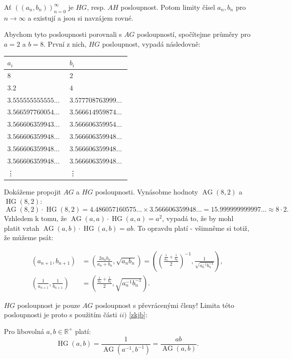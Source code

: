 \documentclass[12pt]{report}
\DeclareMathOperator{\AG}{AG}
\DeclareMathOperator{\HG}{HG}
\begin{document}
\begin{veta}
Ať $((a_n,b_n))_{n=0}^{\infty}$ je $HG$, resp. $AH$ posloupnost. Potom limity čísel $a_n,b_n$ pro $n \rightarrow \infty$ a existují a jsou si navzájem rovné.
\end{veta}

 Abychom tyto posloupnosti porovnali s $AG$ posloupností, spočítejme průměry pro $a=2$ a $b=8$. První z nich, $HG$ posloupnost, vypadá následovně:
\begin{longtable}[H]{>{\raggedright\arraybackslash}p{0.3\linewidth}p{0.202\linewidth}}
\toprule
$a_i$ & $b_i$\\
\midrule
$8$ & \noindent $2$\\
$3.2$ & \noindent $4$\\
$3.555555555555\dots$ & $3.577708763999\dots$\\
$3.566597760054\dots$ & $3.566614959874\dots$\\
$3.566606359943\dots$ & $3.566606359954\dots$\\ 
$3.566606359948\dots$ & $3.566606359948\dots$\\
$3.566606359948\dots$ & $3.566606359948\dots$\\
$3.566606359948\dots$ & $3.566606359948\dots$\\
\vdots & \vdots\\
\bottomrule 
\end{longtable} 
Dokážeme propojit $AG$ a $HG$ posloupnosti. Vynásobme hodnoty $\AG(8,2)$ a $\HG(8,2)$:
$$\AG(8,2) \cdot \HG(8,2) = 4.486057160575\dots \times 3.566606359948\dots = 15.999999999997\dots \approx 8 \cdot 2.$$
Vzhledem k tomu, že $\AG(a,a) \cdot \HG(a,a) = a^2$, vypadá to, že by mohl platit vztah $\AG(a,b) \cdot \HG(a,b) = ab$. To opravdu platí - všimněme si totiž, že můžeme psát:

\begin{align*}
\left(a_{n+1}, b_{n+1} \right) &= \left( \frac{2 a_n b_n}{a_n + b_n}, \sqrt{a_n b_n} \right) = \left( \left(\frac{\frac{1}{a_n}+ \frac{1}{b_n}}{2} \right)^{-1},\frac{1}{ \sqrt{a_n ^{-1} b_n ^{-1}}}  \right),\\
\left(\frac{1}{a_{n+1}}, \frac{1}{b_{n+1}} \right) &= \left(\frac{\frac{1}{a_n}+ \frac{1}{b_n}}{2} , \sqrt{a_n ^{-1} b_n ^{-1}}  \right).
\end{align*}

$HG$ posloupnost je pouze $AG$ posloupnost s převrácenými členy! Limita této posloupnosti je proto s použitím části $ii)$ \ref{zkjb}:
\begin{veta}\label{agh}
Pro libovolná $a,b \in \mathbb{R}^{+}$ platí:
$$\HG(a,b) = \frac{1}{\AG(a^{-1},b^{-1})} = \frac{ab}{\AG(a,b)}.$$
\end{veta}
\end{document}
